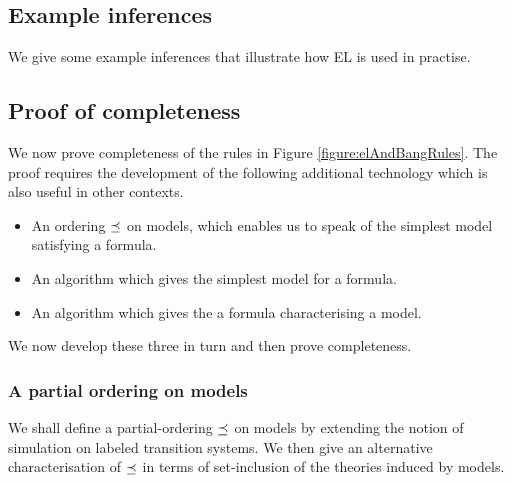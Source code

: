 
\subsection{Example inferences}

We give some example inferences that illustrate how EL is used in
practise.

\subsection{Proof of completeness}\label{completenessProof}

\NI We now prove completeness of the rules in Figure
\ref{figure:elAndBangRules}.  The proof requires the development of
the following additional technology which is also useful in other
contexts.

\begin{itemize}

\item An ordering $\preceq$ on models, which enables us to speak of
  the simplest model satisfying a formula.

\item An algorithm which gives the simplest model for a formula.

\item An algorithm which gives the a formula characterising a model.

\end{itemize}

\NI We now develop these three in turn and then prove completeness.

\subsubsection{A partial ordering on models}

We shall define a partial-ordering $\preceq$ on models by extending
the notion of simulation on labeled transition systems. We then give
an alternative characterisation of $\preceq$ in terms of
set-inclusion of the theories induced by models.

